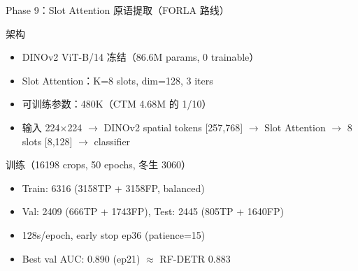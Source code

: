 \documentclass[aspectratio=169, 10pt]{beamer}
\begin{document}
\begin{frame}{Phase 9：Slot Attention 原语提取（FORLA 路线）}
  \begin{block}{架构}
    \begin{itemize}
      \item DINOv2 ViT-B/14 冻结（86.6M params, 0 trainable）
      \item Slot Attention：K=8 slots, dim=128, 3 iters
      \item 可训练参数：480K（CTM 4.68M 的 1/10）
      \item 输入 224$\times$224 $\to$ DINOv2 spatial tokens [257,768] $\to$ Slot Attention $\to$ 8 slots [8,128] $\to$ classifier
    \end{itemize}
  \end{block}
  \vspace{0em}
  \begin{block}{训练（16198 crops, 50 epochs, 冬生 3060）}
    \begin{itemize}
      \item Train: 6316 (3158TP + 3158FP, balanced)
      \item Val: 2409 (666TP + 1743FP), Test: 2445 (805TP + 1640FP)
      \item 128s/epoch, early stop ep36 (patience=15)
      \item Best val AUC: 0.890 (ep21) $\approx$ RF-DETR 0.883
    \end{itemize}
  \end{block}
\end{frame}
\end{document}
